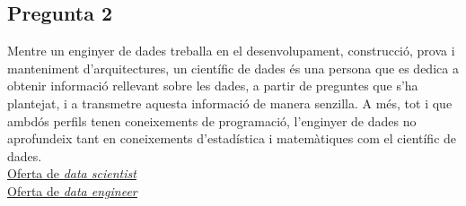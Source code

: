 \documentclass[a4paper,12pt]{report}
\begin{document}
\subsection*{Pregunta 2}
Mentre un enginyer de dades treballa en el desenvolupament, construcció, prova i manteniment d'arquitectures, un científic de dades és una persona que es dedica a obtenir informació rellevant sobre les dades, a partir de preguntes que s'ha plantejat, i a transmetre aquesta informació de manera senzilla. A més, tot i que ambdós perfils tenen coneixements de programació, l'enginyer de dades no aprofundeix tant en coneixements d'estadística i matemàtiques com el científic de dades.\\
\href{https://www.linkedin.com/jobs/search/?currentJobId=4167044480&geoId=104738515&keywords=data%20scientist&origin=JOB_SEARCH_PAGE_SEARCH_BUTTON&refresh=true}{\underline{Oferta de \textit{data scientist}}}\\
\href{https://www.linkedin.com/jobs/search/?currentJobId=4172639382&geoId=104738515&keywords=data%20engineer&origin=JOB_SEARCH_PAGE_SEARCH_BUTTON&refresh=true}{\underline{Oferta de \textit{data engineer}}}
\end{document}
